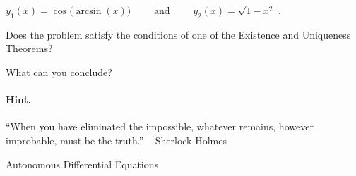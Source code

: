 \hfil $y_1(x) = \cos\big( \arcsin (x) \big) \qquad \text{ and } \qquad y_2(x) = \sqrt{1-x^2}$ \quad . 

\begin{parts}
\item Does the problem satisfy the conditions of one of the Existence and Uniqueness Theorems?

\item What can you conclude?

\end{parts}

\paragraph{Hint.} ``When you have eliminated the impossible, whatever remains, however improbable, must be the truth.'' -- Sherlock Holmes





\standardonlynewpage





\begin{module}{Autonomous Differential Equations}

	\label{ODE:autonomous}

	
	






\end{module}



